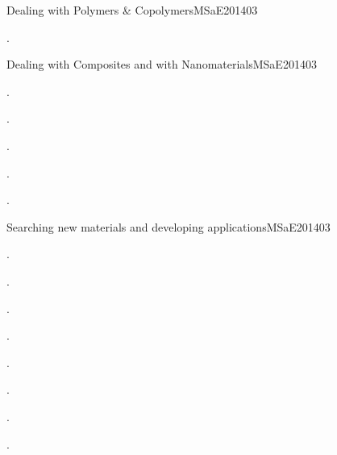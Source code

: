 \begin{syllabus}
\begin{unit}{}{Dealing with Polymers \& Copolymers}{MSaE2014}{0}{3}
\begin{learningoutcomes}
      \item . %
   \end{learningoutcomes}
\end{unit}

\begin{unit}{}{Dealing with Composites and with Nanomaterials}{MSaE2014}{0}{3}
\begin{topics}
      \item . %
      \item . %
      \item . %
      \item . %
\end{topics}
   \begin{learningoutcomes}

      \item . %
   \end{learningoutcomes}
\end{unit}

\begin{unit}{}{Searching new materials and developing applications}{MSaE2014}{0}{3}
\begin{topics}
      \item . %
	  \begin{subtopics}
	  \item . %
	  \item . %
	  \item . %
	  \item . %
	  \item . %
	  \item . %
	  \item . %
	  \end{subtopics}  
\end{topics}
   \begin{learningoutcomes}


\end{learningoutcomes}
\end{unit}
\end{syllabus}
